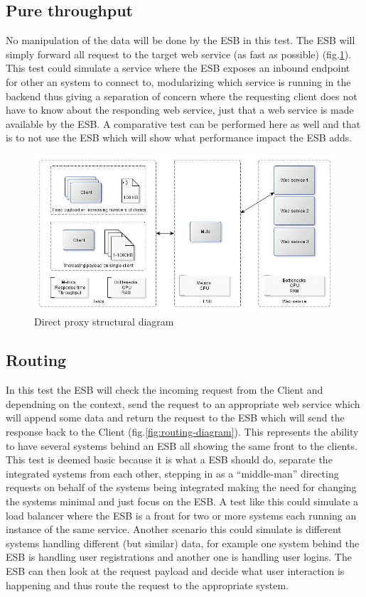 \newpage
\subsection{Pure throughput}
No manipulation of the data will be done by the ESB in this test. The ESB will simply forward all request to the target web service (as fast as possible) (fig.\ref{fig:proxy-diagram}). 
This test could simulate a service where the ESB exposes an inbound endpoint for other an system to connect to, modularizing which service is running in the backend thus giving a separation of concern where the requesting client does not have to know about the responding web service, just that a web service is made available by the ESB.
A comparative test can be performed here as well and that is to not use the ESB which will show what performance impact the ESB adds. 

\begin{figure}[H]
	\centerline{\includegraphics[scale=0.43]{img/direct_proxy}}
	\caption{Direct proxy structural diagram}
	\label{fig:proxy-diagram}
\end{figure}

\newpage
\subsection{Routing}
In this test the ESB will check the incoming request from the Client and dependning on the context, send the request to an appropriate web service which will append some data and return the request to the ESB which will send the response back to the Client (fig.\ref{fig:routing-diagram}).
This represents the ability to have several systems behind an ESB all showing the same front to the clients.
This test is deemed basic because it is what a ESB should do, separate the integrated systems from each other, stepping in as a ``middle-man'' directing requests on behalf of the systems being integrated making the need for changing the systems minimal and just focus on the ESB. 
A test like this could simulate a load balancer where the ESB is a front for two or more systems each running an instance of the same service. Another scenario this could simulate is different systems handling different (but similar) data, for example one system behind the ESB is handling user registrations and another one is handling user logins. The ESB can then look at the request payload and decide what user interaction is happening and thus route the request to the appropriate system.


